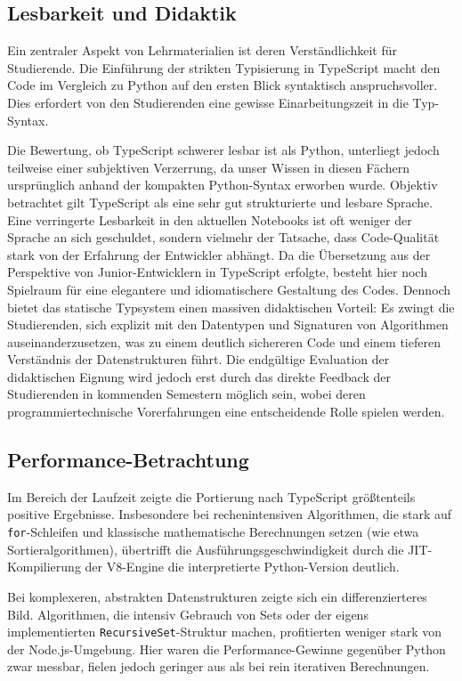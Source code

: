 \subsection{Lesbarkeit und Didaktik}
Ein zentraler Aspekt von Lehrmaterialien ist deren Verständlichkeit für Studierende. Die Einführung der strikten Typisierung in TypeScript macht den Code im Vergleich zu Python auf den ersten Blick syntaktisch anspruchsvoller. Dies erfordert von den Studierenden eine gewisse Einarbeitungszeit in die Typ-Syntax. 

Die Bewertung, ob TypeScript schwerer lesbar ist als Python, unterliegt jedoch teilweise einer subjektiven Verzerrung, da unser Wissen in diesen Fächern ursprünglich anhand der kompakten Python-Syntax erworben wurde. Objektiv betrachtet gilt TypeScript als eine sehr gut strukturierte und lesbare Sprache. Eine verringerte Lesbarkeit in den aktuellen Notebooks ist oft weniger der Sprache an sich geschuldet, sondern vielmehr der Tatsache, dass Code-Qualität stark von der Erfahrung der Entwickler abhängt. Da die Übersetzung aus der Perspektive von Junior-Entwicklern in TypeScript erfolgte, besteht hier noch Spielraum für eine elegantere und idiomatischere Gestaltung des Codes. 
Dennoch bietet das statische Typsystem einen massiven didaktischen Vorteil: Es zwingt die Studierenden, sich explizit mit den Datentypen und Signaturen von Algorithmen auseinanderzusetzen, was zu einem deutlich sichereren Code und einem tieferen Verständnis der Datenstrukturen führt. Die endgültige Evaluation der didaktischen Eignung wird jedoch erst durch das direkte Feedback der Studierenden in kommenden Semestern möglich sein, wobei deren programmiertechnische Vorerfahrungen eine entscheidende Rolle spielen werden.

\subsection{Performance-Betrachtung}
Im Bereich der Laufzeit zeigte die Portierung nach TypeScript größtenteils positive Ergebnisse. Insbesondere bei rechenintensiven Algorithmen, die stark auf \texttt{for}-Schleifen und klassische mathematische Berechnungen setzen (wie etwa Sortieralgorithmen), übertrifft die Ausführungsgeschwindigkeit durch die JIT-Kompilierung der V8-Engine die interpretierte Python-Version deutlich. 

Bei komplexeren, abstrakten Datenstrukturen zeigte sich ein differenzierteres Bild. Algorithmen, die intensiv Gebrauch von Sets oder der eigens implementierten \texttt{RecursiveSet}-Struktur machen, profitierten weniger stark von der Node.js-Umgebung. Hier waren die Performance-Gewinne gegenüber Python zwar messbar, fielen jedoch geringer aus als bei rein iterativen Berechnungen.

